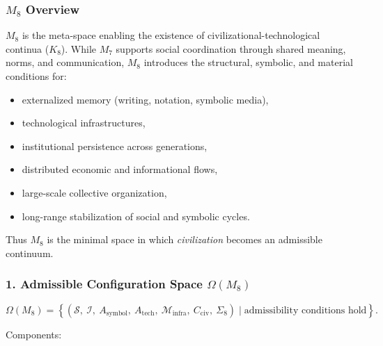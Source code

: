 

\subsubsection{\texorpdfstring{$M_8$}{M_8} Overview}
\label{sec:m8-overview}

$M_8$ is the meta-space enabling the existence of
civilizational-technological continua ($K_8$).
While $M_7$ supports social coordination through shared meaning, norms, and
communication, $M_8$ introduces the structural, symbolic, and material
conditions for:

\begin{itemize}
    \item externalized memory (writing, notation, symbolic media),
    \item technological infrastructures,
    \item institutional persistence across generations,
    \item distributed economic and informational flows,
    \item large-scale collective organization,
    \item long-range stabilization of social and symbolic cycles.
\end{itemize}

Thus $M_8$ is the minimal space in which \emph{civilization} becomes an admissible continuum.

\subsubsection*{1. Admissible Configuration Space \texorpdfstring{$\Omega(M_8)$}{\Omega(M_8)}}

\[
\Omega(M_8)=
\left\{
(
\mathcal{S},\
\mathcal{I},\
A_{\mathrm{symbol}},\
A_{\mathrm{tech}},\
\mathcal{M}_{\mathrm{infra}},\
C_{\mathrm{civ}},\
\Sigma_8
)
\mid \text{admissibility conditions hold}
\right\}.
\]

Components:

